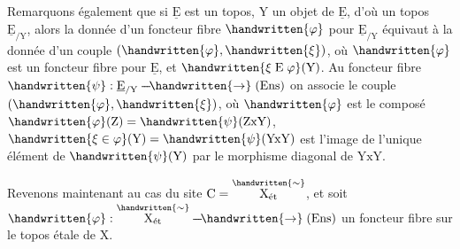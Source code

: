 \begin{lrbox}{\coteSixTypescript}
\begin{minipage}[t]{.96\linewidth}
 Remarquons également que si $\underline{\mathrm E}$ est un topos, $\mathrm Y$ un objet de $\underline{\mathrm E}$, d'où un topos $\underline{\mathrm E}_{/\mathrm Y}$, alors la donnée d'un foncteur fibre $\handwritten{\varphi}$ pour $\underline{\mathrm E}_{/\mathrm Y}$ équivaut à la donnée d'un couple $(\handwritten{\varphi},\handwritten{\xi})$, où $\handwritten{\varphi}$ est un foncteur fibre pour $\underline{\mathrm E}$, et $\handwritten{\xi\mathrel{\mathrm E}\varphi}(\mathrm Y)$. Au foncteur fibre $\handwritten{\psi}:\underline{\mathrm E}_{/\mathrm Y}\mathrel{\mbox{-}\mkern-2mu\mbox{-}\mkern-2mu\mbox{-}\mkern-3mu\handwritten{\to}}(\mathrm{Ens})$ on associe le couple $(\handwritten{\varphi},\handwritten{\xi})$, où $\handwritten{\varphi}$ est le composé $\handwritten{\varphi}(\mathrm Z)=\handwritten{\psi}(\mathrm Z\mathrm{x}\mathrm Y)$, $\handwritten{\xi\in\varphi}(\mathrm Y)=\handwritten{\psi}(\mathrm Y\mathrm{x}\mathrm Y)$ est l'image de l'unique élément de $\handwritten{\psi}(\mathrm Y)$ par le morphisme diagonal de $\mathrm Y\mathrm{x}\mathrm Y$.

 Revenons maintenant au cas du site $\mathrm C=\overset{\handwritten{\sim}}{\mathrm X_{\text{ét}}}$, et soit $\handwritten{\varphi}:\overset{\handwritten{\sim}}{\mathrm X_{\text{ét}}}\mathrel{\mbox{-}\mkern-2mu\mbox{-}\mkern-2mu\mbox{-}\mkern-3mu\handwritten{\to}}(\mathrm{Ens})$ un foncteur fibre sur le topos étale de $\mathrm X$.
\end{minipage}
\end{lrbox}
\noindent{}
